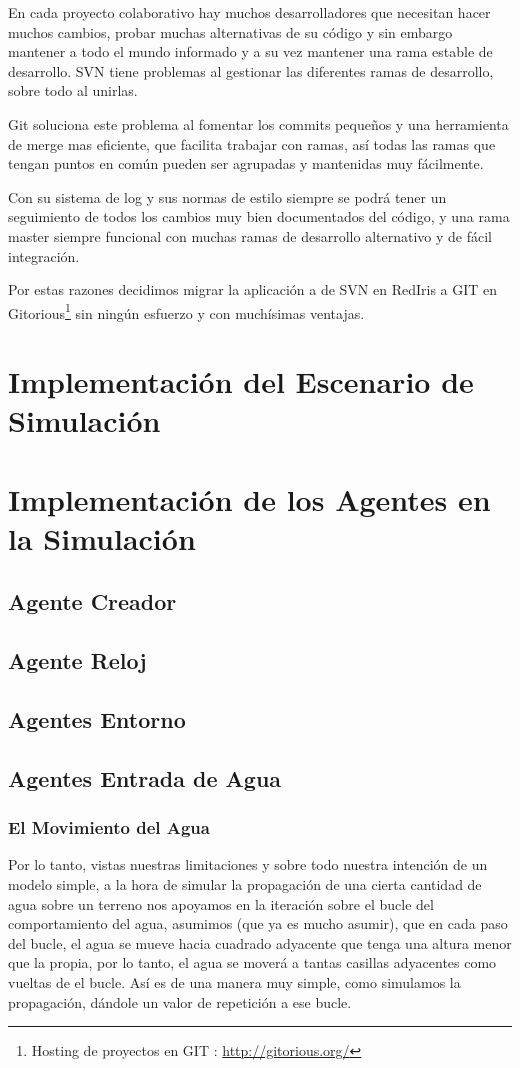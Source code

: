 En cada proyecto colaborativo hay muchos desarrolladores que necesitan hacer
muchos cambios, probar muchas alternativas de su código y sin embargo mantener
a todo el mundo informado y a su vez mantener una rama estable de desarrollo.
SVN tiene problemas al gestionar las diferentes ramas de desarrollo, sobre todo
al unirlas.

Git soluciona este problema al fomentar los commits pequeños y una herramienta
de merge mas eficiente, que facilita trabajar con ramas, así todas las ramas
que tengan puntos en común pueden ser agrupadas y mantenidas muy fácilmente.

Con su sistema de log y sus normas de estilo siempre se podrá tener un
seguimiento de todos los cambios muy bien documentados del código, y una rama
master siempre funcional con muchas ramas de desarrollo alternativo y de fácil
integración.

Por estas razones decidimos migrar la aplicación a de SVN en RedIris a GIT en
Gitorious\footnote{Hosting de proyectos en GIT :
\url{http://gitorious.org/}} sin ningún esfuerzo y con muchísimas ventajas.
\section*{Implementación del Escenario de Simulación}
\section*{Implementación de los Agentes en la Simulación}
\subsection*{Agente Creador}
\subsection*{Agente Reloj}
\subsection*{Agentes Entorno}
\subsection*{Agentes Entrada de Agua}
\subsubsection{El Movimiento del Agua}
Por lo tanto, vistas nuestras limitaciones y sobre todo nuestra intención de un
modelo simple, a la hora de simular la propagación de una cierta cantidad de
agua sobre un terreno nos apoyamos en la iteración sobre el bucle del
comportamiento del agua, asumimos (que ya es mucho asumir), que en cada paso del
bucle, el agua se mueve hacia cuadrado adyacente que tenga una altura menor que
la propia, por lo tanto, el agua se moverá a tantas casillas adyacentes como
vueltas de el bucle. Así es de una manera muy simple, como simulamos la
propagación, dándole un valor de repetición a ese bucle.


